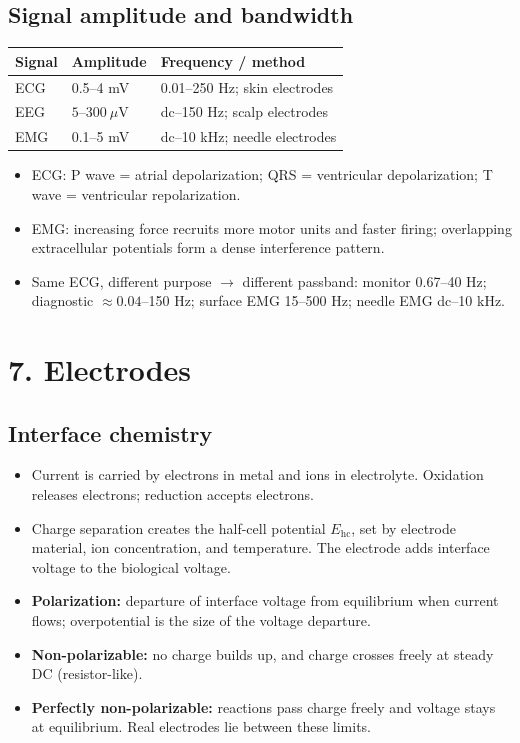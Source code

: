 \documentclass[10pt,a4paper]{ctexart}
\newcommand{\key}[1]{\textbf{#1}}
\begin{document}
\begin{multicols*}{3}
\subsection{Signal amplitude and bandwidth}
\begin{center}\small
\begin{tabularx}{\linewidth}{@{}lYY@{}}
\toprule
Signal & Amplitude & Frequency / method\\
\midrule
ECG & 0.5--4 mV & 0.01--250 Hz; skin electrodes\\
EEG & $5$--$300~\mu\mathrm V$ & dc--150 Hz; scalp electrodes\\
EMG & 0.1--5 mV & dc--10 kHz; needle electrodes\\
\bottomrule
\end{tabularx}
\end{center}

\begin{itemize}
  \item ECG: P wave = atrial depolarization; QRS = ventricular depolarization;
  T wave = ventricular repolarization.
  \item EMG: increasing force recruits more motor units and faster firing;
  overlapping extracellular potentials form a dense interference pattern.
  \item Same ECG, different purpose $\rightarrow$ different passband:
  monitor 0.67--40 Hz; diagnostic $\approx0.04$--150 Hz;
  surface EMG 15--500 Hz; needle EMG dc--10 kHz.
\end{itemize}


\section{7. Electrodes}
\subsection{Interface chemistry}
\begin{itemize}
  \item Current is carried by electrons in metal and ions in electrolyte.
  Oxidation releases electrons; reduction accepts electrons.
  \item Charge separation creates the half-cell potential $E_\mathrm{hc}$,
  set by electrode material, ion concentration, and temperature.
  The electrode adds interface voltage to the biological voltage.
  \item \key{Polarization:} departure of interface voltage from equilibrium when
  current flows; overpotential is the size of the voltage departure.
  \item \key{Non-polarizable:} no charge builds up, and charge crosses freely at steady DC
  (resistor-like). 
  \item \key{Perfectly non-polarizable:} reactions pass charge freely and
  voltage stays at equilibrium. Real electrodes lie between these limits.
\end{itemize}


\end{multicols*}
\end{document}
